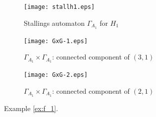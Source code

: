 \documentclass[a4paper,12pt]{article}
\newcommand{\G}{\Gamma }
\numberwithin{equation}{section}
\numberwithin{figure}{section}
\begin{document}
\begin{figure}
\begin{center} 
\begin{subfigure}[b]{.25\columnwidth}
\texttt{[image: stallh1.eps]}
\caption{Stallings automaton $\G_{A_1}$ for $H_1$}
\label{fig:stall1}
\end{subfigure}
\hspace{5mm}
\begin{subfigure}[b]{.25\columnwidth}
\texttt{[image: GxG-1.eps]}
\caption{$\G_{A_1}\times \G_{A_1}$: connected component of $(3,1)$}
\label{fig:GxG-1}
\end{subfigure}
\hspace{5mm}
\begin{subfigure}[b]{.25\columnwidth}
\texttt{[image: GxG-2.eps]}
\caption{$\G_{A_1}\times \G_{A_1}$: connected component of $(2,1)$}
\label{fig:GxG-2}
\end{subfigure}
\end{center}
\caption{Example \ref{ex:f_1}.}\label{fig:stall}
\end{figure}
\end{document}
